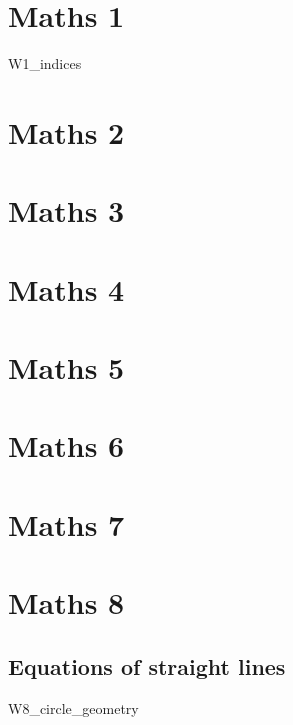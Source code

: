 \documentclass[12pt]{exam}
\begin{document}
\tableofcontents
\newpage

\section{Maths 1}
{W1_indices}

\section{Maths 2}
\section{Maths 3}
\section{Maths 4}
\section{Maths 5}
\section{Maths 6}
\section{Maths 7}

\newpage
\section{Maths 8}
\subsection{Equations of straight lines}
{W8_circle_geometry}
\end{document}
